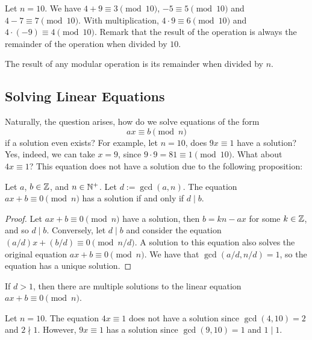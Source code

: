 \begin{example}
   Let $n = 10$. We have $4 + 9 \equiv 3 \pmod{10}$, $-5 \equiv 5 \pmod{10}$ and $4 - 7 \equiv 7 \pmod{10}$. With multiplication, $4 \cdot 9 \equiv 6 \pmod{10}$ and $4 \cdot (-9) \equiv 4 \pmod{10}$. Remark that the result of the operation is always the remainder of the operation when divided by $10$. 
\end{example}
\begin{remark}
   The result of any modular operation is its remainder when divided by $n$. 
\end{remark}

\subsection{Solving Linear Equations}

Naturally, the question arises, how do we solve equations of the form
\[ ax \equiv b \pmod{n} \]
if a solution even exists? For example, let $n = 10$, does $9x \equiv 1$ have a solution? Yes, indeed, we can take $x = 9$, since $9 \cdot 9 = 81 \equiv 1 \pmod{10}$. What about $4x \equiv 1$? This equation does not have a solution due to the following proposition:

\begin{propbox}
   Let $a$, $b \in \mathbb{Z}$, and $n \in \mathbb{N}^+$. Let $d := \gcd(a,n)$. The equation $ax + b \equiv 0 \pmod{n}$ has a solution if and only if $d \mid b$. 
\end{propbox}
\begin{proof}
   Let $ax + b \equiv 0 \pmod{n}$ have a solution, then $b = kn - ax$ for some $k \in \mathbb{Z}$, and so $d \mid b$. Conversely, let $d \mid b$ and consider the equation $(a/d)x + (b/d) \equiv 0 \pmod{n/d}$. A solution to this equation also solves the original equation $ax + b \equiv 0 \pmod{n}$. We have that $\gcd(a/d, n/d) = 1$, so the equation has a unique solution. 
\end{proof}

\begin{remark}
   If $d > 1$, then there are multiple solutions to the linear equation $ax + b \equiv 0 \pmod{n}$. 
\end{remark}

\begin{example}
   Let $n = 10$. The equation $4x \equiv 1$ does not have a solution since $\gcd(4, 10) = 2$ and $2 \nmid 1$. However, $9x \equiv 1$ has a solution since $\gcd(9,10) = 1$ and $1 \mid 1$. 
\end{example}

